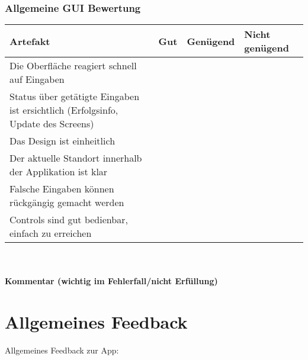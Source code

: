 \documentclass[10pt,a4paper]{scrartcl}
\begin{document}
\subsubsection*{Allgemeine GUI Bewertung}
\begin{tabular}{|p{}|p{}|p{}|p{}|}
\hline 
\rule[-1ex]{0pt}{2.5ex} \textbf{Artefakt} & \textbf{Gut} & \textbf{Genügend} & \textbf{Nicht genügend} \\ 
\hline 
\rule[-1ex]{0pt}{2.5ex} Die Oberfläche reagiert schnell auf Eingaben &  &  &  \\ 
\hline 
\rule[-1ex]{0pt}{2.5ex} Status über getätigte Eingaben ist ersichtlich (Erfolgsinfo, Update des Screens) &  &  &  \\ 
\hline 
\rule[-1ex]{0pt}{2.5ex} Das Design ist einheitlich &  &  &  \\ 
\hline 
\rule[-1ex]{0pt}{2.5ex} Der aktuelle Standort innerhalb der Applikation ist klar &  &  &  \\ 
\hline 
\rule[-1ex]{0pt}{2.5ex} Falsche Eingaben können rückgängig gemacht werden &  &  &  \\ 
\hline 
\rule[-1ex]{0pt}{2.5ex} Controls sind gut bedienbar, einfach zu erreichen &  &  &  \\  
\hline 
\end{tabular} 
\\
\\
\textbf{Kommentar (wichtig im Fehlerfall/nicht Erfüllung)}
\vspace*{4cm}

\newpage
\section{Allgemeines Feedback}
Allgemeines Feedback zur App:
\end{document}
